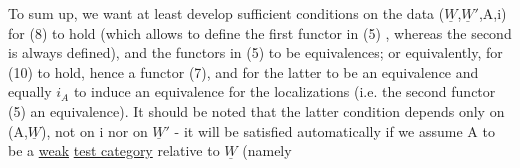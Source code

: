 To sum up, we want at least develop sufficient conditions on the
data ($\underline{W}$,$\underline{W}'$,A,i) for (8) to hold (which allows to define the first
functor in (5) , whereas the second is always defined), and the functors
in (5) to be equivalences; or equivalently, for (10) to hold, hence
a functor (7), and for the latter to be an equivalence\hand{,} and 
 equally $i_A$ to induce an equivalence
for the localizations (i.e. the second functor (5) an equivalence).
It should be noted that the latter condition depends only on (A,$\underline{W}$), not
on i nor on $\underline{W}'$ - it will be satisfied automatically if we assume A to
be a \uline{weak} \uline{test category} relative to $\underline{W}$ (namely 

